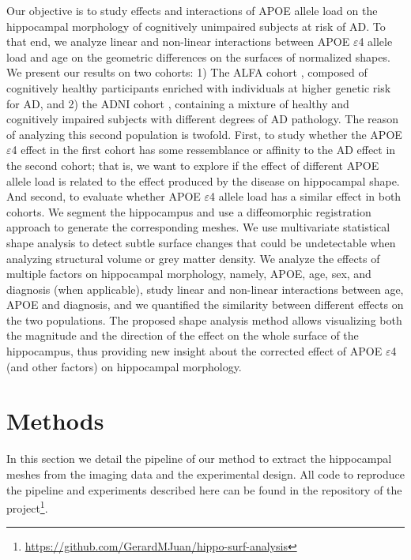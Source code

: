 Our objective is to study effects and interactions of APOE allele load on the hippocampal morphology of cognitively unimpaired subjects at risk of AD. To that end, we analyze linear and non-linear interactions between APOE $\varepsilon$4 allele load and age on the geometric differences on the surfaces of normalized shapes. We present our results on two cohorts: 1) The ALFA cohort \cite{Molinuevo2016}, composed of cognitively healthy participants enriched with individuals at higher genetic risk for AD, and 2) the ADNI cohort \cite{Mueller2005a}, containing a mixture of healthy and cognitively impaired subjects with different degrees of AD pathology. The reason of analyzing this second population is twofold. First, to study whether the APOE $\varepsilon$4 effect in the first cohort has some ressemblance or affinity to the AD effect in the second cohort; that is, we want to explore if the effect of different APOE allele load is related to the effect produced by the disease on hippocampal shape. And second, to evaluate whether APOE $\varepsilon$4 allele load has a similar effect in both cohorts. We segment the hippocampus and use a diffeomorphic registration approach to generate the corresponding meshes. We use multivariate statistical shape analysis to detect subtle surface changes that could be undetectable when analyzing structural volume or grey matter density. We analyze the effects of multiple factors on hippocampal morphology, namely, APOE, age, sex, and diagnosis (when applicable), study linear and non-linear interactions between age, APOE and diagnosis, and we quantified the similarity between different effects on the two populations. The proposed shape analysis method allows visualizing both the magnitude and the direction of the effect on the whole surface of the hippocampus, thus providing new insight about the corrected effect of APOE $\varepsilon$4 (and other factors) on hippocampal morphology.  \\

\section{Methods}
\label{sec:methods}

In this section we detail the pipeline of our method to extract the hippocampal meshes from the imaging data and the experimental design. All code to reproduce the pipeline and experiments described here can be found in the repository of the project\footnote{\url{https://github.com/GerardMJuan/hippo-surf-analysis}}.


